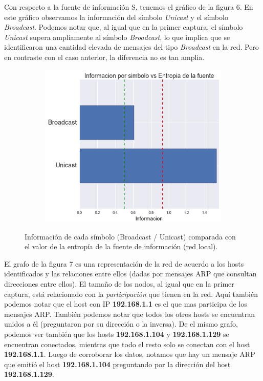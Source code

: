 \par Con respecto a la fuente de información S, tenemos el gráfico de la figura 6. En este gráfico observamos la información del símbolo \textit{Unicast} y el símbolo \textit{Broadcast}. Podemos notar que, al igual que en la primer captura, el símbolo \textit{Unicast} supera ampliamente al símbolo \textit{Broadcast}, lo que implica que se identificaron una cantidad elevada de mensajes del tipo \textit{Broadcast} en la red. Pero en contraste con el caso anterior, la diferencia no es tan amplia.

\begin{figure}[h]
  \begin{subfigure}{.5\textwidth}
    \includegraphics[width=\textwidth]{imagenes/hogarenia/brvsun_informaciones_vs_entropia.png}
  \end{subfigure}
  \label{fig:exp2_hogar_brvsun_infovsentro}
  \caption{Información de cada símbolo (Broadcast / Unicast) comparada con el valor de la entropía de la fuente de información (red local).}
\end{figure}

\par El grafo de la figura 7 es una representación de la red de acuerdo a los hosts identificados y las relaciones entre ellos (dadas por mensajes ARP que consultan direcciones entre ellos). El tamaño de los nodos, al igual que en la primer captura, está relacionado con la \textit{participación} que tienen en la red. Aquí también podemos notar que el host con IP \textbf{192.168.1.1} es el que mas participa de los mensajes ARP. También podemos notar que todos los otros hosts se encuentran unidos a él (preguntaron por su dirección o la inversa). De el mismo grafo, podemos ver también que los hosts \textbf{192.168.1.104} y \textbf{192.168.1.129} se encuentran conectados, mientras que todo el resto solo se conectan con el host \textbf{192.168.1.1}. Luego de corroborar los datos, notamos que hay un mensaje ARP que emitió el host \textbf{192.168.1.104} preguntando por la dirección del host \textbf{192.168.1.129}.


